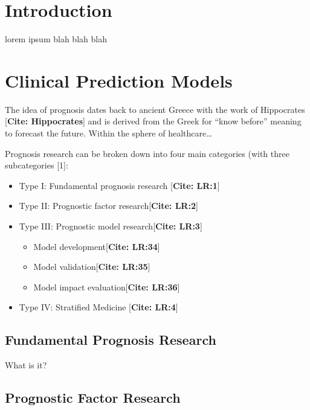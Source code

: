 \documentclass[12pt,twoside]{reedthesis}
\providecommand{\tightlist}{%
  \setlength{\itemsep}{0pt}\setlength{\parskip}{0pt}}
\begin{document}
\hypertarget{introduction}{%
\section{Introduction}\label{introduction}}

lorem ipsum blah blah blah

\hypertarget{clinical-prediction-models}{%
\section{Clinical Prediction Models}\label{clinical-prediction-models}}

The idea of prognosis dates back to ancient Greece with the work of Hippocrates {[}\textbf{Cite: Hippocrates}{]} and is derived from the Greek for ``know before'' meaning to forecast the future. Within the sphere of healthcare\ldots{}

Prognosis research can be broken down into four main categories (with three subcategories {[}1{]}:
\begin{itemize}
\tightlist
\item
  Type I: Fundamental prognosis research {[}\textbf{Cite: LR:1}{]}
\item
  Type II: Prognostic factor research{[}\textbf{Cite: LR:2}{]}
\item
  Type III: Prognostic model research{[}\textbf{Cite: LR:3}{]}
  \begin{itemize}
  \tightlist
  \item
    Model development{[}\textbf{Cite: LR:34}{]}
  \item
    Model validation{[}\textbf{Cite: LR:35}{]}
  \item
    Model impact evaluation{[}\textbf{Cite: LR:36}{]}
  \end{itemize}
\item
  Type IV: Stratified Medicine {[}\textbf{Cite: LR:4}{]}
\end{itemize}
\hypertarget{fundamental-prognosis-research}{%
\subsection{Fundamental Prognosis Research}\label{fundamental-prognosis-research}}

What is it?

\hypertarget{prognostic-factor-research}{%
\subsection{Prognostic Factor Research}\label{prognostic-factor-research}}
\end{document}
